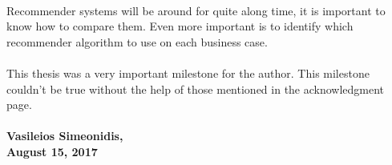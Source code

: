 \paragraph{} Recommender systems will be around for quite along time, it is important to know how to compare them. Even more important is to identify which recommender algorithm to use on each business case.

\paragraph{} This thesis was a very important milestone for the author. This milestone couldn't be true without the help of those mentioned in the acknowledgment page.
\\
\paragraph{Vasileios Simeonidis, \\ August 15, 2017}